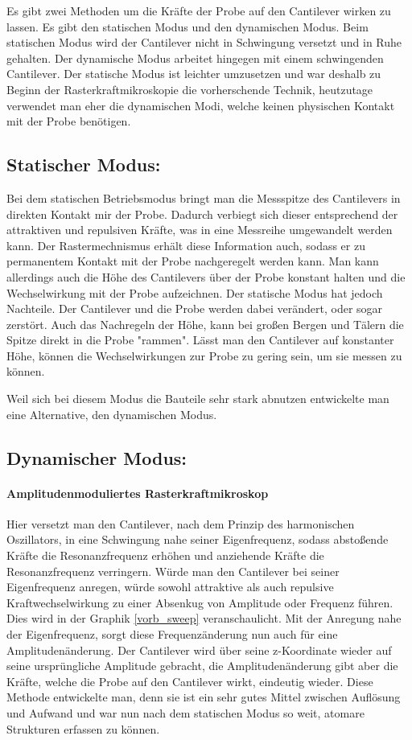 Es gibt zwei Methoden um die Kräfte der Probe auf den Cantilever wirken zu lassen.
Es gibt den statischen Modus und den dynamischen Modus. 
Beim statischen Modus wird der Cantilever nicht in Schwingung versetzt und in Ruhe gehalten.
Der dynamische Modus arbeitet hingegen mit einem schwingenden Cantilever.
Der statische Modus ist leichter umzusetzen und war deshalb zu Beginn der Rasterkraftmikroskopie die vorherschende Technik, heutzutage verwendet man eher die dynamischen Modi, welche keinen physischen Kontakt mit der Probe benötigen.


\subsection{Statischer Modus:}

Bei dem statischen Betriebsmodus bringt man die Messspitze des Cantilevers in direkten Kontakt mir der Probe.
Dadurch verbiegt sich dieser entsprechend der attraktiven und repulsiven Kräfte, was in eine Messreihe umgewandelt werden kann.
Der Rastermechnismus erhält diese Information auch, sodass er zu permanentem Kontakt mit der Probe nachgeregelt werden kann.
Man kann allerdings auch die Höhe des Cantilevers über der Probe konstant halten und die Wechselwirkung mit der Probe aufzeichnen.
Der statische Modus hat jedoch Nachteile.
Der Cantilever und die Probe werden dabei verändert, oder sogar zerstört.
Auch das Nachregeln der Höhe, kann bei großen Bergen und Tälern die Spitze direkt in die Probe "rammen".
Lässt man den Cantilever auf konstanter Höhe, können die Wechselwirkungen zur Probe zu gering sein, um sie messen zu können.

Weil sich bei diesem Modus die Bauteile sehr stark abnutzen entwickelte man eine Alternative, den dynamischen Modus.

\subsection{Dynamischer Modus:}

       \paragraph{Amplitudenmoduliertes Rasterkraftmikroskop}

Hier versetzt man den Cantilever, nach dem Prinzip des harmonischen Oszillators, in eine Schwingung nahe seiner Eigenfrequenz, sodass abstoßende Kräfte die Resonanzfrequenz erhöhen und anziehende Kräfte die Resonanzfrequenz verringern. 
Würde man den Cantilever bei seiner Eigenfrequenz anregen, würde sowohl attraktive als auch repulsive Kraftwechselwirkung zu einer Absenkug von Amplitude oder Frequenz führen. Dies wird in der Graphik \ref{vorb_sweep} veranschaulicht.
Mit der Anregung nahe der Eigenfrequenz, sorgt diese Frequenzänderung nun auch für eine Amplitudenänderung.
Der Cantilever wird über seine z-Koordinate wieder auf seine ursprüngliche Amplitude gebracht, die Amplitudenänderung gibt aber die Kräfte, welche die Probe auf den Cantilever wirkt, eindeutig wieder.
Diese Methode entwickelte man, denn sie ist ein sehr gutes Mittel zwischen Auflösung und Aufwand und war nun nach dem statischen Modus so weit, atomare Strukturen erfassen zu können.

